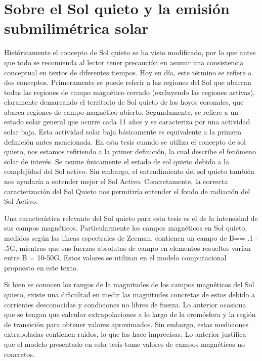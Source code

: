 \documentclass[9pt]{book}
\begin{document}
\section{Sobre el Sol quieto y la emisi\'on submilim\'etrica solar}
Hist\'oricamente el concepto de Sol quieto se ha visto modificado, por lo que antes que todo se recomienda al lector tener precauci\'on en asumir una consistencia conceptual en textos de diferentes tiempos. Hoy en d\'ia, este t\'ermino se refiere a dos conceptos. Primeramente se puede referir a las regiones del Sol que abarcan todas las regiones de campo magn\'etico cerrado (excluyendo las regiones activas), claramente demarcando el territorio de Sol quieto de los hoyos coronales, que abarca regiones de campo magn\'etico abierto.
Segundamente, se refiere a un estado solar general que ocurre cada 11 a\~nos y se caracteriza por una actividad solar baja. Esta actividad solar baja b\'asicamente es equivalente a la primera definici\'on antes mencionada. En esta tesis cuando se utiliza el concepto de sol quieto, nos estamos refiriendo a la primer definici\'on, la cual describe el fen\'omeno solar de inter\'es. Se asume \'unicamente el estado de sol quieto debido a la complejidad del Sol activo. Sin embargo, el entendimiento del sol quieto tambi\'en nos ayudar\'ia a entender mejor el Sol Activo. Concretamente, la correcta caracterizaci\'on del Sol Quieto nos permitir\'ia entender el fondo de radiaci\'on del Sol Activo.

Una caracter\'istica relevante del Sol quieto para esta tesis es el de la intensidad de sus campos magn\'eticos. Particularmente los campos magn\'eticos en Sol quieto, medidos seg\'un las l\'ineas espectrales de Zeeman, contienen un campo de B== .1 - .5G, mientras que sus fuerzas absolutas de campo en elementos resueltos var\'ian entre B = 10-50G. Estos valores se utilizan en el modelo computacional propuesto en este texto.

Si bien se conocen los rangos de la magnitudes de los campos magn\'eticos del Sol quieto, existe una dificultad en medir las magnitudes concretas de estos debido a corrientes desconocidas y condiciones no libres de fuerza. Lo anterior ocasiona que se tengan que calcular extrapolaciones a lo largo de la crom\'osfera y la regi\'on de transici\'on para obtener valores aproximados. Sin embargo, estas mediciones extrapoladas contienen ruidos, lo que las hace imprecisas. Lo anterior justifica que el modelo presentado en esta tesis tome valores de campos magn\'eticos no concretos.
\end{document}
